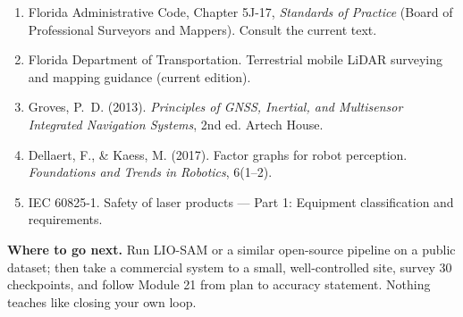 \begin{enumerate}[leftmargin=*]
\item Florida Administrative Code, Chapter 5J-17, \emph{Standards of Practice} (Board of Professional Surveyors and Mappers). Consult the current text.
\item Florida Department of Transportation. Terrestrial mobile LiDAR surveying and mapping guidance (current edition).
\item Groves, P.\ D. (2013). \emph{Principles of GNSS, Inertial, and Multisensor Integrated Navigation Systems}, 2nd ed. Artech House.
\item Dellaert, F., \& Kaess, M. (2017). Factor graphs for robot perception. \emph{Foundations and Trends in Robotics}, 6(1--2).
\item IEC 60825-1. Safety of laser products --- Part 1: Equipment classification and requirements.
\end{enumerate}

\vspace{1em}
\begin{bigidea}
\textbf{Where to go next.} Run LIO-SAM or a similar open-source pipeline on a public dataset; then take a commercial system to a small, well-controlled site, survey 30 checkpoints, and follow Module 21 from plan to accuracy statement. Nothing teaches like closing your own loop.
\end{bigidea}
